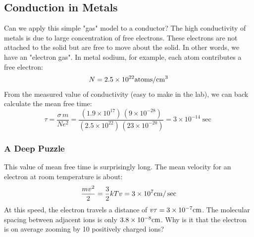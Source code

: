\subsection{Conduction in Metals}
Can we apply this simple "gas" model to a conductor?  The  high conductivity of metals is due to large concentration of free electrons.   These electrons are not attached to the solid but are free to move about the solid.  In other words, we have an "electron gas".   In metal sodium, for example,  each atom contributes a free electron: 
\[
        N = 2.5 \times {10^{22}}{\rm{atoms/c}}{{\rm{m}}^{\rm{3}}}
\]
From the measured value of conductivity (easy to make in the lab), we can back calculate the mean free time:
\begin{equation}\tau  = \frac{{\sigma \,m}}{{N{e^2}}} = \frac{{\left( {1.9 \times {{10}^{17}}} \right)\,\left( {9 \times {{10}^{ - 28}}} \right)}}{{\left( {2.5 \times {{10}^{22}}} \right)\,\left( {23 \times {{10}^{ - 20}}} \right)}} = 3 \times {10^{ - 14}}\sec
\end{equation}
\subsubsection{A Deep Puzzle}
This value of mean free time is surprisingly long.  The mean velocity for an electron at room temperature is about: 
\begin{equation}
        \frac{{m{v^2}}}{2} = \frac{3}{2}kT  v = 3 \times {10^7}{\rm{cm}}/\sec
\end{equation}
At this speed, the electron travels a distance of $v\tau  = 3 \times {10^{ - 7}}{\rm{cm}}$.  The molecular spacing between adjacent ions is only $3.8 \times {10^{ - 8}}{\rm{cm}}$.  Why is it that the electron is on average zooming by 10 positively charged ions?
